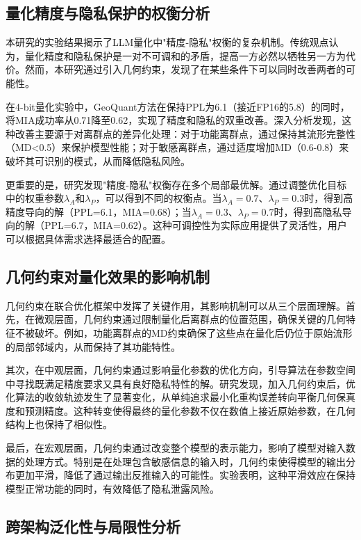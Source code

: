 \subsection{量化精度与隐私保护的权衡分析}

本研究的实验结果揭示了LLM量化中"精度-隐私"权衡的复杂机制。传统观点认为，量化精度和隐私保护是一对不可调和的矛盾，提高一方必然以牺牲另一方为代价。然而，本研究通过引入几何约束，发现了在某些条件下可以同时改善两者的可能性。

在4-bit量化实验中，GeoQuant方法在保持PPL为6.1（接近FP16的5.8）的同时，将MIA成功率从0.71降至0.62，实现了精度和隐私的双重改善。深入分析发现，这种改善主要源于对离群点的差异化处理：对于功能离群点，通过保持其流形完整性（MD<0.5）来保护模型性能；对于敏感离群点，通过适度增加MD（0.6-0.8）来破坏其可识别的模式，从而降低隐私风险。

更重要的是，研究发现"精度-隐私"权衡存在多个局部最优解。通过调整优化目标中的权重参数$\lambda_A$和$\lambda_P$，可以得到不同的权衡点。当$\lambda_A=0.7$、$\lambda_P=0.3$时，得到高精度导向的解（PPL=6.1，MIA=0.68）；当$\lambda_A=0.3$、$\lambda_P=0.7$时，得到高隐私导向的解（PPL=6.7，MIA=0.62）。这种可调控性为实际应用提供了灵活性，用户可以根据具体需求选择最适合的配置。

\subsection{几何约束对量化效果的影响机制}

几何约束在联合优化框架中发挥了关键作用，其影响机制可以从三个层面理解。首先，在微观层面，几何约束通过限制量化后离群点的位置范围，确保关键的几何特征不被破坏。例如，功能离群点的MD约束确保了这些点在量化后仍位于原始流形的局部邻域内，从而保持了其功能特性。

其次，在中观层面，几何约束通过影响量化参数的优化方向，引导算法在参数空间中寻找既满足精度要求又具有良好隐私特性的解。研究发现，加入几何约束后，优化算法的收敛轨迹发生了显著变化，从单纯追求最小化重构误差转向平衡几何保真度和预测精度。这种转变使得最终的量化参数不仅在数值上接近原始参数，在几何结构上也保持了相似性。

最后，在宏观层面，几何约束通过改变整个模型的表示能力，影响了模型对输入数据的处理方式。特别是在处理包含敏感信息的输入时，几何约束使得模型的输出分布更加平滑，降低了通过输出反推输入的可能性。实验表明，这种平滑效应在保持模型正常功能的同时，有效降低了隐私泄露风险。

\subsection{跨架构泛化性与局限性分析}

